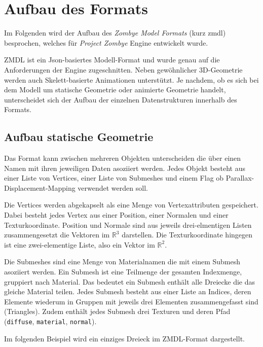\chapter{Aufbau des Formats}
Im Folgenden wird der Aufbau des \textit{Zombye Model Formats} (kurz zmdl) besprochen, welches für \textit{Project Zombye} Engine entwickelt wurde.

ZMDL ist ein Json-basiertes Modell-Format und wurde genau auf die Anforderungen der Engine zugeschnitten. Neben gewöhnlicher 3D-Geometrie werden auch Skelett-basierte Animationen unterstützt. Je nachdem, ob es sich bei dem Modell um statische Geometrie oder animierte Geometrie handelt, unterscheidet sich der Aufbau der einzelnen Datenstrukturen innerhalb des Formats.

\section{Aufbau statische Geometrie}
Das Format kann zwischen mehreren Objekten unterscheiden die über einen Namen mit ihren jeweiligen Daten asoziiert werden. Jedes Objekt besteht aus einer Liste von Vertices, einer Liste von Submeshes und einem Flag ob Parallax-Displacement-Mapping verwendet werden soll.

Die Vertices werden abgekapselt als eine Menge von Vertexattributen gespeichert. Dabei besteht jedes Vertex aus einer Position, einer Normalen und einer Texturkoordinate. Position und Normale sind aus jeweils drei-elmentigen Listen zusammengesetzt die Vektoren im $\mathbb{R}^3$ darstellen. Die Texturkoordinate hingegen ist eine zwei-elementige Liste, also ein Vektor im $\mathbb{R}^2$.

Die Submeshes sind eine Menge von Materialnamen die mit einem Submesh asoziiert werden. Ein Submesh ist eine Teilmenge der gesamten Indexmenge, gruppiert nach Material. Das bedeutet ein Submesh enthält alle Dreiecke die das gleiche Material teilen. Jedes Submesh besteht aus einer Liste an Indices, deren Elemente wiederum in Gruppen mit jeweils drei Elementen zusammengefasst sind (Triangles). Zudem enthält jedes Submesh drei Texturen und deren Pfad (\texttt{diffuse}, \texttt{material}, \texttt{normal}).

Im folgenden Beispiel wird ein einziges Dreieck im ZMDL-Format dargestellt.
\vspace{3cm}

